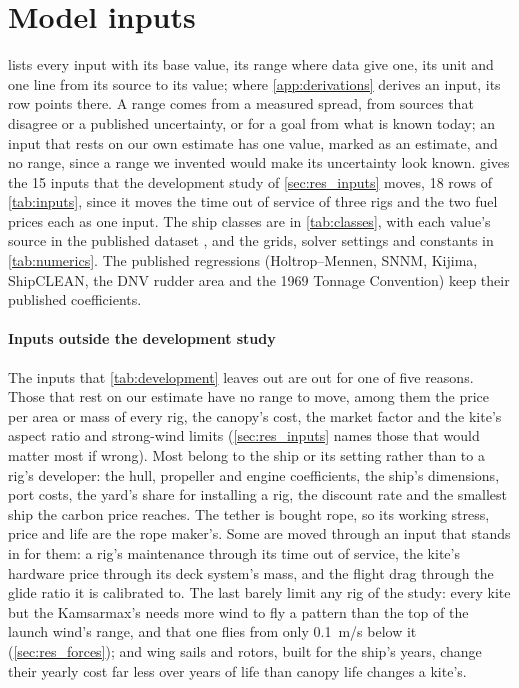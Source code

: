 \section{Model inputs}
\label{sec:inputs}

 lists every input with its base value, its range where data give one, its unit and one line from its source to its value; where \cref{app:derivations} derives an input, its row points there. A range comes from a measured spread, from sources that disagree or a published uncertainty, or for a goal from what is known today; an input that rests on our own estimate has one value, marked as an estimate, and no range, since a range we invented would make its uncertainty look known.  gives the 15 inputs that the development study of \cref{sec:res_inputs} moves, 18 rows of \cref{tab:inputs}, since it moves the time out of service of three rigs and the two fuel prices each as one input. The ship classes are in \cref{tab:classes}, with each value's source in the published dataset \citep{windshipopt_data}, and the grids, solver settings and constants in \cref{tab:numerics}. The published regressions (Holtrop--Mennen, SNNM, Kijima, ShipCLEAN, the DNV rudder area and the 1969 Tonnage Convention) keep their published coefficients.

\paragraph{Inputs outside the development study} The inputs that \cref{tab:development} leaves out are out for one of five reasons. Those that rest on our estimate have no range to move, among them the price per area or mass of every rig, the canopy's cost, the market factor and the kite's aspect ratio and strong-wind limits (\cref{sec:res_inputs} names those that would matter most if wrong). Most belong to the ship or its setting rather than to a rig's developer: the hull, propeller and engine coefficients, the ship's dimensions, port costs, the yard's share for installing a rig, the discount rate and the smallest ship the carbon price reaches. The tether is bought rope, so its working stress, price and life are the rope maker's. Some are moved through an input that stands in for them: a rig's maintenance through its time out of service, the kite's hardware price through its deck system's mass, and the flight drag through the glide ratio it is calibrated to. The last barely limit any rig of the study: every kite but the Kamsarmax's needs more wind to fly a pattern than the top of the launch wind's range, and that one flies from only \SI{0.1}{m/s} below it (\cref{sec:res_forces}); and wing sails and rotors, built for the ship's  years, change their yearly cost far less over  years of life than canopy life changes a kite's.

